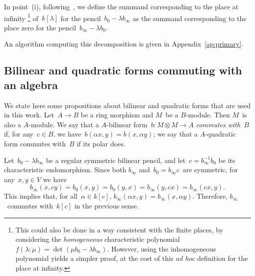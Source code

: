 \documentclass{lms}
\begin{document}
In point~(i), following~\cite[§~4]{inventiones1976waterhouse},
we define the summand corresponding to the place at infinity%
\footnote{This could also be done in a way consistent with the finite places,
by considering the \emph{homogeneous} characteristic polynomial
$f(λ: μ) = \det (μ b_0 - λ b_∞)$.
However, using the inhomogeneous polynomial yields a simpler proof,
at the cost of this \emph{ad hoc} definition for the place at infinity.}
of~$k[λ]$ for the pencil~$b_0 - λ b_∞$ as the summand corresponding to
the place zero for the pencil~$b_∞ - λ b_0$.

An algorithm computing this decomposition
is given in Appendix~\ref{ap:primary}.

\subsection{Bilinear and quadratic forms commuting with an algebra}
\label{ss:commute}
We state here some propositions about bilinear and quadratic forms
that are used in this work.
Let~$A → B$ be a ring morphism and $M$~be a $B$-module.
Then $M$~is also a $A$-module.
We say that a $A$-bilinear form~$b: M ⊗ M → A$ \emph{commutes with~$B$}
if, for any~$c ∈ B$, we have~$b(α x, y) = b(x, α y)$;
we say that a $A$-quadratic form commutes with~$B$ if its polar does.

Let~$b_0 - λ b_∞$ be a regular symmetric bilinear pencil,
and let~$c = b_∞^{-1} b_0$ be its characteristic endomorphism.
Since both $b_∞$ and~$b_0=b_∞ c$~are symmetric, for any~$x, y ∈ V$ we have
\begin{equation}
b_∞(x, c y) = b_0(x, y) = b_0(y, x) = b_∞(y, c x) = b_∞(c x, y).
\end{equation}
This implies that, for all~$α ∈ k[c]$, $b_∞(α x, y) = b_∞(x, α y)$.
Therefore, $b_∞$~commutes with~$k[c]$ in the previous sense.
\end{document}
